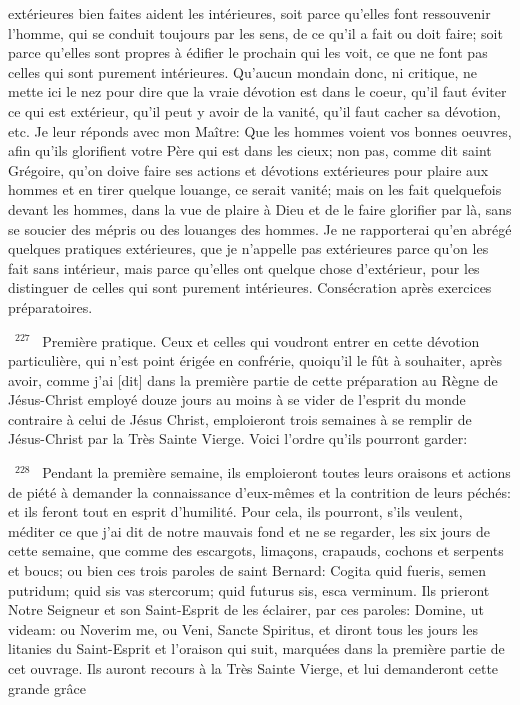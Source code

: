 \documentclass[paper=a5,pagesize=pdftex,fontsize=15pt,headinclude=on,twoside=off]{scrbook}
\newcommand{\negphantom}[1]{\settowidth{\dimen0}{#1}\hspace*{-\dimen0}}
\newcommand{\versenb}[1]{\par \vspace{10pt}~\negphantom{~${}^{#1}$~}${}^{#1}$~}
\begin{document}
extérieures bien faites aident les intérieures, soit parce qu'elles font ressouvenir l'homme, qui se conduit toujours
par les sens, de ce qu'il a fait ou doit faire; soit parce qu'elles sont propres à édifier le prochain qui les voit, ce que
ne font pas celles qui sont purement intérieures. Qu'aucun mondain donc, ni critique, ne mette ici le nez pour dire
que la vraie dévotion est dans le coeur, qu'il faut éviter ce qui est extérieur, qu'il peut y avoir de la vanité, qu'il faut
cacher sa dévotion, etc. Je leur réponds avec mon Maître: Que les hommes voient vos bonnes oeuvres, afin qu'ils
glorifient votre Père qui est dans les cieux; non pas, comme dit saint Grégoire, qu'on doive faire ses actions et
dévotions extérieures pour plaire aux hommes et en tirer quelque louange, ce serait vanité; mais on les fait
quelquefois devant les hommes, dans la vue de plaire à Dieu et de le faire glorifier par là, sans se soucier des
mépris ou des louanges des hommes. Je ne rapporterai qu'en abrégé quelques pratiques extérieures, que je
n'appelle pas extérieures parce qu'on les fait sans intérieur, mais parce qu'elles ont quelque chose d'extérieur,
pour les distinguer de celles qui sont purement intérieures.
Consécration après exercices préparatoires.
\versenb{227} Première pratique. Ceux et celles qui voudront entrer en cette dévotion particulière, qui n'est point érigée en
confrérie, quoiqu'il le fût à souhaiter, après avoir, comme j'ai [dit] dans la première partie de cette préparation au
Règne de Jésus-Christ employé douze jours au moins à se vider de l'esprit du monde contraire à celui de Jésus Christ, emploieront trois semaines à se remplir de Jésus-Christ par la Très Sainte Vierge. Voici l'ordre qu'ils
pourront garder:
\versenb{228} Pendant la première semaine, ils emploieront toutes leurs oraisons et actions de piété à demander la
connaissance d'eux-mêmes et la contrition de leurs péchés: et ils feront tout en esprit d'humilité. Pour cela, ils
pourront, s'ils veulent, méditer ce que j'ai dit de notre mauvais fond et ne se regarder, les six jours de cette
semaine, que comme des escargots, limaçons, crapauds, cochons et serpents et boucs; ou bien ces trois paroles
de saint Bernard: Cogita quid fueris, semen putridum; quid sis vas stercorum; quid futurus sis, esca verminum. Ils
prieront Notre Seigneur et son Saint-Esprit de les éclairer, par ces paroles: Domine, ut videam: ou Noverim me, ou
Veni, Sancte Spiritus, et diront tous les jours les litanies du Saint-Esprit et l'oraison qui suit, marquées dans la
première partie de cet ouvrage. Ils auront recours à la Très Sainte Vierge, et lui demanderont cette grande grâce
\end{document}
